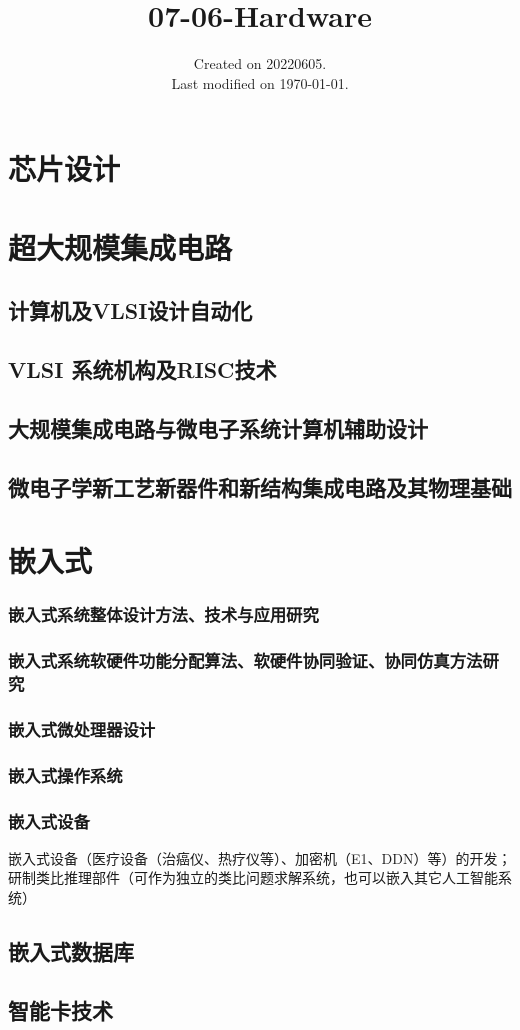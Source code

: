 \documentclass[UTF8]{../computerUniverse}
\begin{document}
\title{07-06-Hardware}
\date{Created on 20220605.\\   Last modified on \today.}
\maketitle
\tableofcontents


\chapter{芯片设计}

\chapter{超大规模集成电路}
\section{计算机及VLSI设计自动化}
\section{VLSI 系统机构及RISC技术}
\section{大规模集成电路与微电子系统计算机辅助设计}
\section{微电子学新工艺新器件和新结构集成电路及其物理基础}



\chapter{嵌入式}
\subsection{嵌入式系统整体设计方法、技术与应用研究}
\subsection{嵌入式系统软硬件功能分配算法、软硬件协同验证、协同仿真方法研究}
\subsection{嵌入式微处理器设计}
\subsection{嵌入式操作系统}

\subsection{嵌入式设备}
嵌入式设备（医疗设备（治癌仪、热疗仪等）、加密机（E1、DDN）等）的开发；研制类比推理部件（可作为独立的类比问题求解系统，也可以嵌入其它人工智能系统）
\section{嵌入式数据库}

\section{智能卡技术}
\end{document}
